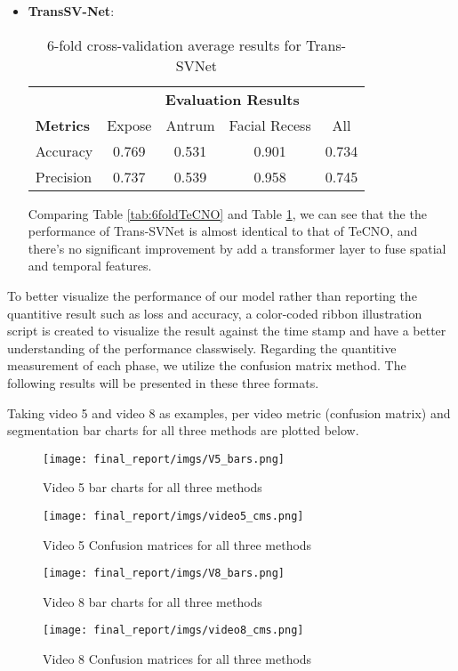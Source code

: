 \documentclass[11pt]{article} \usepackage[top=1in, bottom=1in, left=1in, right=1in]{geometry}
\begin{document}
\begin{itemize}
    \item \textbf{TransSV-Net}:
    \begin{table}[ht!] 
        \centering
        \begin{tabular}{l c c c c}
        \toprule %
        & \multicolumn{4}{c}{\textbf{Evaluation Results}} \\ 
        \cmidrule(l){2-5}
        \textbf{Metrics} & Expose & Antrum & Facial Recess & All\\ 
        \midrule %
            Accuracy  &  0.769 &  0.531 &  0.901 & 0.734\\
            Precision &  0.737 &  0.539 &  0.958 & 0.745\\
        \bottomrule %
        \end{tabular}
        \caption{6-fold cross-validation average results for Trans-SVNet}
        \label{tab:6foldTransSVNet} 
    \end{table}
    Comparing Table \ref{tab:6foldTeCNO} and Table \ref{tab:6foldTransSVNet}, we can see that the the performance of Trans-SVNet is almost identical to that of TeCNO, and there's no significant improvement by add a transformer layer to fuse spatial and temporal features.
\end{itemize}
To better visualize the performance of our model rather than reporting the quantitive result such as loss and accuracy, a color-coded ribbon illustration script is created to visualize the result against the time stamp and have a better understanding of the performance classwisely. Regarding the quantitive measurement of each phase, we utilize the confusion matrix method. The following results will be presented in these three formats.

\vspace{0.25cm}
\noindent
Taking video 5 and video 8 as examples, per video metric (confusion matrix) and segmentation bar charts for all three methods are plotted below.
\begin{figure}[H]
  \texttt{[image: final\_report/imgs/V5\_bars.png]}
  \centering
  \caption{Video 5 bar charts for all three methods }
  \label{fig:v5_bars}
\end{figure}
\begin{figure}[H]
  \texttt{[image: final\_report/imgs/video5\_cms.png]}
  \centering
  \caption{Video 5 Confusion matrices for all three methods }
  \label{fig:v5_cms}
\end{figure}
\begin{figure}[H]
  \texttt{[image: final\_report/imgs/V8\_bars.png]}
  \centering
  \caption{Video 8 bar charts for all three methods }
  \label{fig:v8_bars}
\end{figure}
\begin{figure}[H]
  \texttt{[image: final\_report/imgs/video8\_cms.png]}
  \centering
  \caption{Video 8 Confusion matrices for all three methods }
  \label{fig:v8_cms}
\end{figure}
\end{document}
